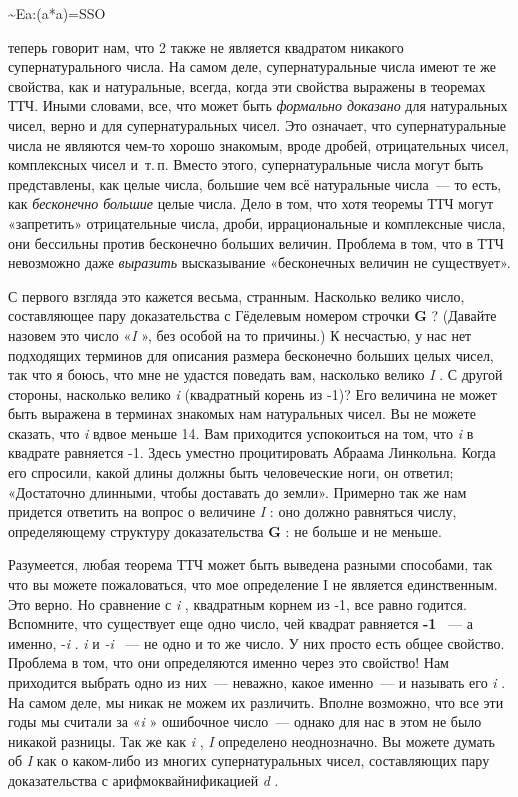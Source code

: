 \documentclass[../main.tex]{subfiles}
\begin{document}
\textasciitilde Ea:(a*a)=SSO

теперь говорит нам, что 2 также не является квадратом никакого супернатурального числа. На самом деле, супернатуральные числа имеют те же свойства, как и натуральные, всегда, когда эти свойства выражены в теоремах ТТЧ\@. Иными словами, все, что может быть \emph{формально доказано} для натуральных чисел, верно и для супернатуральных чисел. Это означает, что супернатуральные числа не являются чем-то хорошо знакомым, вроде дробей, отрицательных чисел, комплексных чисел и~т.\,п. Вместо этого, супернатуральные числа могут быть представлены, как целые числа, большие чем всё натуральные числа~--- то есть, как \emph{бесконечно большие} целые числа. Дело в том, что хотя теоремы ТТЧ могут «запретить» отрицательные числа, дроби, иррациональные и комплексные числа, они бессильны против бесконечно больших величин. Проблема в том, что в ТТЧ невозможно даже \emph{выразить} высказывание «бесконечных величин не существует».

С первого взгляда это кажется весьма, странным. Насколько велико число, составляющее пару доказательства с Гёделевым номером строчки \textbf{G} ? (Давайте назовем это число «\emph{I} », без особой на то причины.) К несчастью, у нас нет подходящих терминов для описания размера бесконечно больших целых чисел, так что я боюсь, что мне не удастся поведать вам, насколько велико \emph{I} . С другой стороны, насколько велико \emph{i} (квадратный корень из -1)? Его величина не может быть выражена в терминах знакомых нам натуральных чисел. Вы не можете сказать, что \emph{i} вдвое меньше 14. Вам приходится успокоиться на том, что \emph{i} в квадрате равняется -1. Здесь уместно процитировать Абраама Линкольна. Когда его спросили, какой длины должны быть человеческие ноги, он ответил; «Достаточно длинными, чтобы доставать до земли». Примерно так же нам придется ответить на вопрос о величине \emph{I} : оно должно равняться числу, определяющему структуру доказательства \textbf{G} : не больше и не меньше.

Разумеется, любая теорема ТТЧ может быть выведена разными способами, так что вы можете пожаловаться, что мое определение I не является единственным. Это верно. Но сравнение с \emph{i} , квадратным корнем из -1, все равно годится. Вспомните, что существует еще одно число, чей квадрат равняется \textbf{-1} ~--- а именно, -\emph{i} . \emph{i} и \emph{-i} ~--- не одно и то же число. У них просто есть общее свойство. Проблема в том, что они определяются именно через это свойство! Нам приходится выбрать одно из них~--- неважно, какое именно~--- и называть его \emph{i} . На самом деле, мы никак не можем их различить. Вполне возможно, что все эти годы мы считали за «\emph{i} » ошибочное число~--- однако для нас в этом не было никакой разницы. Так же как \emph{i} , \emph{I} определено неоднозначно. Вы можете думать об \emph{I} как о каком-либо из многих супернатуральных чисел, составляющих пару доказательства с арифмоквайнификацией \emph{d} .
\end{document}
